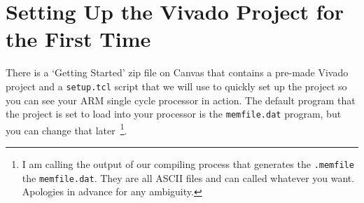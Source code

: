 \documentclass{article}
\begin{document}
\section{Setting Up the Vivado Project for the First Time}

There is a `Getting Started' zip file on Canvas that contains a pre-made Vivado
project and a \verb|setup.tcl| script that we will use to quickly set up the
project so you can see your ARM single cycle processor in action.  The default
program that the project is set to load into your processor is the 
\verb|memfile.dat| program, but you can change that later~\footnote{I
am calling the output of our compiling process that generates the
\verb!.memfile! the \verb!memfile.dat!.  They are all ASCII files and
can called whatever you want.  Apologies in advance for any ambiguity.}.
\end{document}
